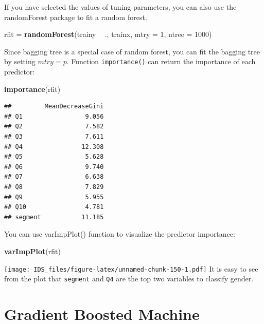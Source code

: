 \documentclass[12pt,]{krantz}
\makeatletter
\newenvironment{Shaded}{\begin{snugshade}}{\end{snugshade}}
\newcommand{\DataTypeTok}[1]{\textcolor[rgb]{0.27,0.27,0.27}{#1}}
\newcommand{\DecValTok}[1]{\textcolor[rgb]{0.06,0.06,0.06}{#1}}
\newcommand{\KeywordTok}[1]{\textcolor[rgb]{0.27,0.27,0.27}{\textbf{#1}}}
\newcommand{\NormalTok}[1]{#1}
\newcommand{\OperatorTok}[1]{\textcolor[rgb]{0.43,0.43,0.43}{\textbf{#1}}}
\newcommand{\StringTok}[1]{\textcolor[rgb]{0.5,0.5,0.5}{#1}}
\newenvironment{kframe}{%
\medskip{}
\setlength{\fboxsep}{.8em}
 \def\at@end@of@kframe{}%
 \ifinner\ifhmode%
  \def\at@end@of@kframe{\end{minipage}}%
  \begin{minipage}{\columnwidth}%
 \fi\fi%
 \def\FrameCommand##1{\hskip\@totalleftmargin \hskip-\fboxsep
 \colorbox{shadecolor}{##1}\hskip-\fboxsep
     \hskip-\linewidth \hskip-\@totalleftmargin \hskip\columnwidth}%
 \MakeFramed {\advance\hsize-\width
   \@totalleftmargin\z@ \linewidth\hsize
   \@setminipage}}%
 {\par\unskip\endMakeFramed%
 \at@end@of@kframe}
\renewenvironment{Shaded}{\begin{kframe}}{\end{kframe}}
\makeatother
\begin{document}
If you have selected the values of tuning parameters, you can also use the randomForest package to fit a random forest.

\begin{Shaded}
\begin{Highlighting}[]
\NormalTok{rfit =}\StringTok{ }\KeywordTok{randomForest}\NormalTok{(trainy }\OperatorTok{~}\StringTok{ }\NormalTok{., trainx, }\DataTypeTok{mtry =} \DecValTok{1}\NormalTok{, }\DataTypeTok{ntree =} \DecValTok{1000}\NormalTok{)}
\end{Highlighting}
\end{Shaded}

Since bagging tree is a special case of random forest, you can fit the bagging tree by setting \(mtry=p\). Function \texttt{importance()} can return the importance of each predictor:

\begin{Shaded}
\begin{Highlighting}[]
\KeywordTok{importance}\NormalTok{(rfit)}
\end{Highlighting}
\end{Shaded}

\begin{verbatim}
##         MeanDecreaseGini
## Q1                 9.056
## Q2                 7.582
## Q3                 7.611
## Q4                12.308
## Q5                 5.628
## Q6                 9.740
## Q7                 6.638
## Q8                 7.829
## Q9                 5.955
## Q10                4.781
## segment           11.185
\end{verbatim}

You can use varImpPlot() function to visualize the predictor importance:

\begin{Shaded}
\begin{Highlighting}[]
\KeywordTok{varImpPlot}\NormalTok{(rfit)}
\end{Highlighting}
\end{Shaded}

\texttt{[image: IDS\_files/figure-latex/unnamed-chunk-150-1.pdf]}
It is easy to see from the plot that \texttt{segment} and \texttt{Q4} are the top two variables to classify gender.

\hypertarget{gradient-boosted-machine}{%
\section{Gradient Boosted Machine}\label{gradient-boosted-machine}}
\end{document}
